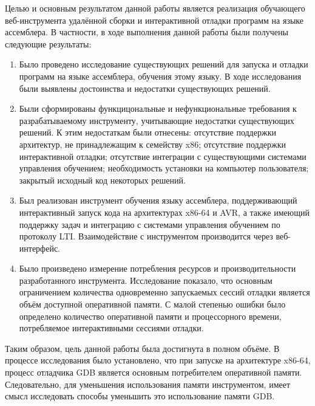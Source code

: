 \documentclass[a4paper,article,14pt]{extarticle}
\begin{document}
\pagebreak
{}

Целью и основным результатом данной работы является реализация обучающего веб-инструмента удалённой сборки и интерактивной отладки программ на языке ассемблера. В частности, в ходе выполнения данной работы были получены следующие результаты:

\begin{enumerate}
    \item Было проведено исследование существующих решений для запуска и отладки программ на языке ассемблера, обучения этому языку. В ходе исследования были выявлены достоинства и недостатки существующих решений.
    \item Были сформированы функцицональные и нефункциональные требования к разрабатываемому инструменту, учитывающие недостатки существующих решений. К этим недостаткам были отнесены: отсутствие поддержки архитектур, не принадлежащим к семейству x86; отсутствие поддержки интерактивной отладки; отсутствие интеграции с существующими системами управления обучением; необходимость установки на компьютер пользователя; закрытый исходный код некоторых решений.
    \item Был реализован инструмент обучения языку ассемблера, поддерживающий интерактивный запуск кода на архитектурах x86-64 и AVR, а также имеющий поддержку задач и интеграцию с системами управления обучением по протоколу LTI. Взаимодействие с инструментом производится через веб-интерфейс.
    \item Было произведено измерение потребления ресурсов и производительности разработанного инструмента. Исследование показало, что основным ограничением количества одновременно запускаемых сессий отладки является объём доступной оперативной памяти. С малой степенью ошибки было определено количество оперативной памяти и процессорного времени, потребляемое интерактивными сессиями отладки.
\end{enumerate}

Таким образом, цель данной работы была достигнута в полном объёме. В процессе исследования было установлено, что при запуске на архитектуре x86-64, процесс отладчика GDB является основным потребителем оперативной памяти. Следовательно, для уменьшения использования памяти инструментом, имеет смысл исследовать способы уменьшить это использование памяти GDB.

\pagebreak
\begin{thebibliography}{1}
\printbibliography[heading=none]
\end{thebibliography}
\end{document}
